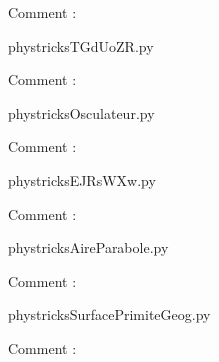     Comment : 

    \clearpage
    


    \newcommand{\CaptionFigTGdUoZR}{<+Type your caption here+>}
    \begin{center}
        
    \end{center}
    phystricksTGdUoZR.py

    Comment : 

    \clearpage
    


    \newcommand{\CaptionFigOsculateur}{<+Type your caption here+>}
    \begin{center}
        
    \end{center}
    phystricksOsculateur.py

    Comment : 

    \clearpage
    


    \newcommand{\CaptionFigEJRsWXw}{<+Type your caption here+>}
    \begin{center}
        
    \end{center}
    phystricksEJRsWXw.py

    Comment : 

    \clearpage
    


    \newcommand{\CaptionFigAireParabole}{<+Type your caption here+>}
    \begin{center}
        
    \end{center}
    phystricksAireParabole.py

    Comment : 

    \clearpage
    


    \newcommand{\CaptionFigSurfacePrimiteGeog}{<+Type your caption here+>}
    \begin{center}
        
    \end{center}
    phystricksSurfacePrimiteGeog.py

    Comment : 

    \clearpage
    

